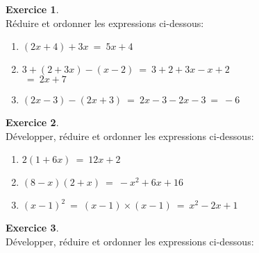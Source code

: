 \documentclass[10pt,a4paper]{article}
\theoremstyle{definition}
\theoremstyle{definition}
\newtheorem{exo}{Exercice}
\begin{document}
\begin{center}
	\begin{minipage}[c]{0.4\linewidth}
		\raggedright
		\begin{exo}\quad\hfill\textbf{}\\
		Réduire et ordonner les expressions ci-dessous:
			\begin{enumerate}
				\item $(2x + 4) + 3x \ = \ 5x + 4$
				\item $3 + (2 + 3x)-(x - 2)\ = \ 3 + 2 + 3x -x + 2 $ \\ $ \ = \ 2x + 7$
				
				\item $(2x-3)-(2x+3) \ = \ 2x-3-2x-3 \ = \ -6$ 
			\end{enumerate}

		\end{exo}
		\begin{exo}\quad\hfill\textbf{}\\
		Développer, réduire et ordonner les expressions ci-dessous:

			\begin{enumerate}
				\item $2(1 + 6x) \ = \ 12x +2$
				\item $ (8 - x)(2 + x) \ = \ -x^2 + 6x + 16$
				
				
				\item $(x-1)^2 \ = \ (x-1)\times(x-1) \ = \  x^2 -2x +1$
			\end{enumerate}

		\end{exo}
		\begin{exo}\quad\hfill\textbf{}\\
				Développer, réduire et ordonner les expressions ci-dessous:


\end{exo}
\end{minipage}
\end{center}
\end{document}
